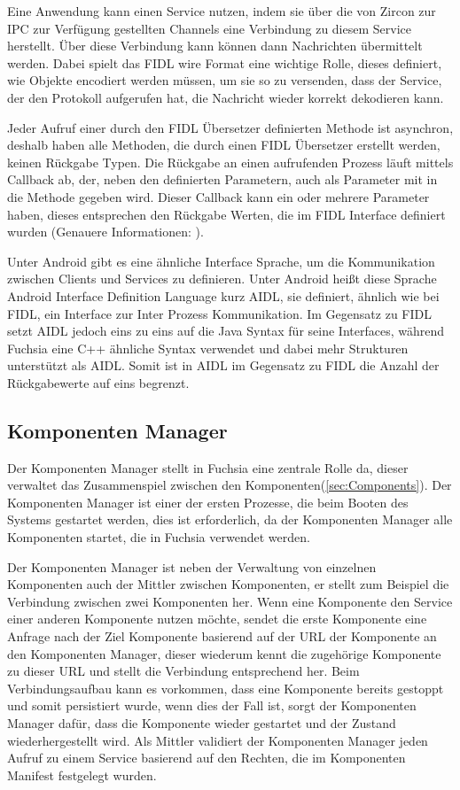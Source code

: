 \documentclass[a4paper]{scrartcl}
\begin{document}
Eine Anwendung kann einen Service nutzen, indem sie über die von Zircon zur IPC zur Verfügung gestellten Channels eine Verbindung zu diesem Service herstellt. Über diese Verbindung kann können dann Nachrichten übermittelt werden. Dabei spielt das FIDL wire Format eine wichtige Rolle, dieses definiert, wie Objekte encodiert werden müssen, um sie so zu versenden, dass der Service, der den Protokoll aufgerufen hat, die Nachricht wieder korrekt dekodieren kann.

Jeder Aufruf einer durch den FIDL Übersetzer definierten Methode ist asynchron, deshalb haben alle Methoden, die durch einen FIDL Übersetzer erstellt werden, keinen Rückgabe Typen. Die Rückgabe an einen aufrufenden Prozess läuft mittels Callback ab, der, neben den definierten Parametern, auch als Parameter mit in die Methode gegeben wird. Dieser Callback kann ein oder mehrere Parameter haben, dieses entsprechen den Rückgabe Werten, die im FIDL Interface definiert wurden (Genauere Informationen: \cite{https://fuchsia.googlesource.com/docs/+/ea2fce2874556205204d3ef70c60e25074dc7ffd/development/languages/fidl/tutorial.md}).

Unter Android gibt es eine ähnliche Interface Sprache, um die Kommunikation zwischen Clients und Services zu definieren. Unter Android heißt diese Sprache Android Interface Definition Language kurz AIDL, sie definiert, ähnlich wie bei FIDL, ein Interface zur Inter Prozess Kommunikation. Im Gegensatz zu FIDL setzt AIDL jedoch eins zu eins auf die Java Syntax für seine Interfaces, während Fuchsia eine C++ ähnliche Syntax verwendet und dabei mehr Strukturen unterstützt als AIDL. Somit ist in AIDL im Gegensatz zu FIDL die Anzahl der Rückgabewerte auf eins begrenzt.
\subsection{Komponenten Manager}
Der Komponenten Manager stellt in Fuchsia eine zentrale Rolle da, dieser verwaltet das Zusammenspiel zwischen den Komponenten(\ref{sec:Components}). Der Komponenten Manager ist einer der ersten Prozesse, die beim Booten des Systems gestartet werden, dies ist erforderlich, da der Komponenten Manager alle Komponenten startet, die in Fuchsia verwendet werden.

Der Komponenten Manager ist neben der Verwaltung von einzelnen Komponenten auch der Mittler zwischen Komponenten, er stellt zum Beispiel die Verbindung zwischen zwei Komponenten her. Wenn eine Komponente den Service einer anderen Komponente nutzen möchte, sendet die erste Komponente eine Anfrage nach der Ziel Komponente basierend auf der URL der Komponente an den Komponenten Manager, dieser wiederum kennt die zugehörige Komponente zu dieser URL und stellt die Verbindung entsprechend her. Beim Verbindungsaufbau kann es vorkommen, dass eine Komponente bereits gestoppt und somit persistiert wurde, wenn dies der Fall ist, sorgt der Komponenten Manager dafür, dass die Komponente wieder gestartet und der Zustand wiederhergestellt wird. Als Mittler validiert der Komponenten Manager jeden Aufruf zu einem Service basierend auf den Rechten, die im Komponenten Manifest festgelegt wurden.
\end{document}
